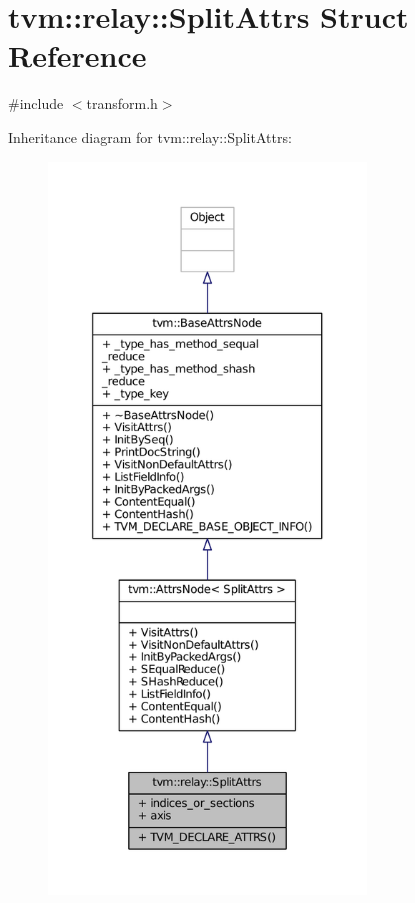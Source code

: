 \hypertarget{structtvm_1_1relay_1_1SplitAttrs}{}\section{tvm\+:\+:relay\+:\+:Split\+Attrs Struct Reference}
\label{structtvm_1_1relay_1_1SplitAttrs}


{\ttfamily \#include $<$transform.\+h$>$}



Inheritance diagram for tvm\+:\+:relay\+:\+:Split\+Attrs\+:
\nopagebreak
\begin{figure}[H]
\begin{center}
\leavevmode
\includegraphics[height=550pt]{structtvm_1_1relay_1_1SplitAttrs__inherit__graph}
\end{center}
\end{figure}


